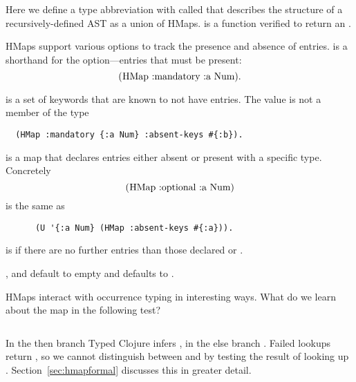 \begin{exmp}
\begin{listing}
\inputminted[firstline=5,lastline=8]{clojure}{code/demo/src/demo/hmap.clj}
\inputminted[firstline=26,lastline=28]{clojure}{code/demo/src/demo/hmap.clj}
\end{listing}
\end{exmp}

Here we define a type abbreviation with  called 
that describes the structure of a recursively-defined AST as a union of HMaps.
 is a function verified to return an .

HMaps support various options to track the presence and absence of entries.
 is a shorthand for the  option---entries that
must be present:
$$
\clj{(HMap :mandatory {:a Num})}.
$$

 is a set of keywords that are known to not have entries.
The value  is not a member of the type
\smallskip
\begin{verbatim}
  (HMap :mandatory {:a Num} :absent-keys #{:b}).
\end{verbatim}

 is a map that declares entries either absent or
present with a specific type. Concretely
$$
\clj{(HMap :optional {:a Num})}
$$
is the same as
\begin{verbatim}
      (U '{:a Num} (HMap :absent-keys #{:a})).
\end{verbatim}


 is  if there are no further entries
than those declared  or .

,  and  default to empty
and  defaults to .

HMaps interact with occurrence typing in interesting ways.
What do we learn about the map  in the following test?

\begin{exmp}
\inputminted[firstline=5,lastline=9]{racket}{code/demo/src/demo/hmap_path.clj}
\end{exmp}

In the then branch Typed Clojure infers , in the else branch
. Failed lookups return ,
so we cannot distinguish between  and 
by testing the result of looking up .
Section~\ref{sec:hmapformal} discusses this in greater detail.

